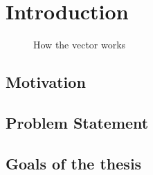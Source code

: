\chapter{Introduction}
\label{sec:introduction}

\begin{figure}
  \begin{center}
    
    \caption{How the vector works}
  \end{center}
\end{figure}

\section{Motivation}
\label{sec:introduction:motivation}


\section{Problem Statement}
\label{sec:introduction:problemStatement}


\section{Goals of the thesis}
\label{sec:introduction:goals}
